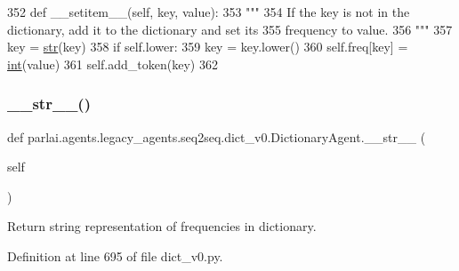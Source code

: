 \begin{DoxyCode}
352     \textcolor{keyword}{def }\_\_setitem\_\_(self, key, value):
353         \textcolor{stringliteral}{"""}
354 \textcolor{stringliteral}{        If the key is not in the dictionary, add it to the dictionary and set its}
355 \textcolor{stringliteral}{        frequency to value.}
356 \textcolor{stringliteral}{        """}
357         key = \hyperlink{namespacegenerate__task__READMEs_a5b88452ffb87b78c8c85ececebafc09f}{str}(key)
358         \textcolor{keywordflow}{if} self.lower:
359             key = key.lower()
360         self.freq[key] = \hyperlink{namespacelanguage__model_1_1eval__ppl_a7d12ee00479673c5c8d1f6d01faa272a}{int}(value)
361         self.add\_token(key)
362 
\end{DoxyCode}
\mbox{\label{classparlai_1_1agents_1_1legacy__agents_1_1seq2seq_1_1dict__v0_1_1DictionaryAgent_ae380876d4ad2c7292e8610985ff2184d}} 
\subsubsection{\texorpdfstring{\+\_\+\+\_\+str\+\_\+\+\_\+()}{\_\_str\_\_()}}
{\footnotesize\ttfamily def parlai.\+agents.\+legacy\+\_\+agents.\+seq2seq.\+dict\+\_\+v0.\+Dictionary\+Agent.\+\_\+\+\_\+str\+\_\+\+\_\+ (\begin{DoxyParamCaption}\item[{}]{self }\end{DoxyParamCaption})}

\begin{DoxyVerb}Return string representation of frequencies in dictionary.
\end{DoxyVerb}
 

Definition at line 695 of file dict\+\_\+v0.\+py.


